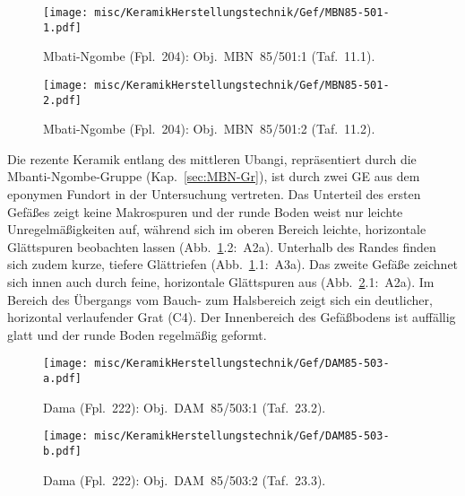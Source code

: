 \begin{figure*}[p]
	\centering
	\begin{subfigure}{\textwidth}
		\centering
		\texttt{[image: misc/KeramikHerstellungstechnik/Gef/MBN85-501-1.pdf]}
		\caption{Mbati-Ngombe (Fpl.~204): Obj.~MBN~85/501:1 (Taf.~11.1).\vspace{1em}}
		\label{MBN85-501-1_Makrospuren}
	\end{subfigure}
	\begin{subfigure}{\textwidth}
		\centering
		\texttt{[image: misc/KeramikHerstellungstechnik/Gef/MBN85-501-2.pdf]}
		\caption{Mbati-Ngombe (Fpl.~204): Obj.~MBN~85/501:2 (Taf.~11.2).}
		\label{MBN85-501-2_Makrospuren}
	\end{subfigure}
	\caption{Makrospuren: Aufnahme und Details.}
\end{figure*}

Die rezente Keramik entlang des mittleren Ubangi, repräsentiert durch die Mbanti-Ngombe-Gruppe (Kap.~\ref{sec:MBN-Gr}), ist durch zwei GE aus dem eponymen Fundort in der Untersuchung vertreten. Das Unterteil des ersten Gefäßes zeigt keine Makrospuren und der runde Boden weist nur leichte Unregelmäßigkeiten auf, während sich im oberen Bereich leichte, horizontale Glättspuren beobachten lassen (Abb.~\ref{MBN85-501-1_Makrospuren}.2:~A2a). Unterhalb des Randes finden sich zudem kurze, tiefere Glättriefen (Abb.~\ref{MBN85-501-1_Makrospuren}.1:~A3a). Das zweite Gefäße zeichnet sich innen auch durch feine, horizontale Glättspuren aus (Abb.~\ref{MBN85-501-2_Makrospuren}.1:~A2a). Im Bereich des Übergangs vom Bauch- zum Halsbereich zeigt sich ein deutlicher, horizontal verlaufender Grat (C4). Der Innenbereich des Gefäßbodens ist auffällig glatt und der runde Boden regelmäßig geformt.

\begin{figure*}[p]
	\centering
	\begin{subfigure}{\textwidth}
		\centering
		\texttt{[image: misc/KeramikHerstellungstechnik/Gef/DAM85-503-a.pdf]}
		\caption{Dama (Fpl.~222): Obj.~DAM~85/503:1 (Taf.~23.2).\vspace{1em}}
		\label{DAM85-503-1_Makrospuren}
	\end{subfigure}
	\begin{subfigure}{\textwidth}
		\centering
		\texttt{[image: misc/KeramikHerstellungstechnik/Gef/DAM85-503-b.pdf]}
		\caption{Dama (Fpl.~222): Obj.~DAM~85/503:2 (Taf.~23.3).}
		\label{DAM85-503-2_Makrospuren}
	\end{subfigure}
	\caption{Makrospuren: Aufnahme und Details.}
\end{figure*}

